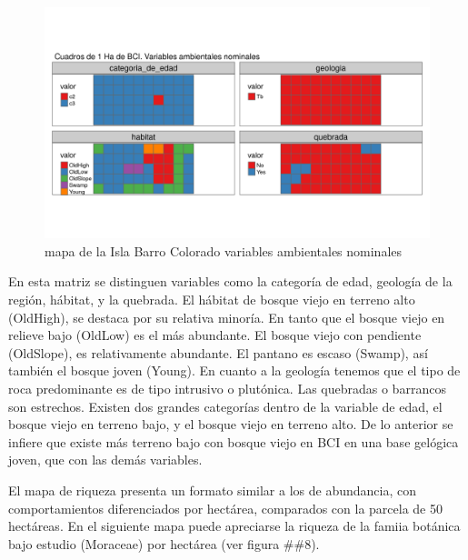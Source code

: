 \documentclass[11pt,]{article}
\begin{document}
\begin{figure}
\centering
\includegraphics[width=1.00000\textwidth]{mapas_variables_ambientales_nominales_tmap.png}
\caption{mapa de la Isla Barro Colorado variables ambientales nominales
\label{fig:bci_map}}
\end{figure}

En esta matriz se distinguen variables como la categoría de edad,
geología de la región, hábitat, y la quebrada. El hábitat de bosque
viejo en terreno alto (OldHigh), se destaca por su relativa minoría. En
tanto que el bosque viejo en relieve bajo (OldLow) es el más abundante.
El bosque viejo con pendiente (OldSlope), es relativamente abundante. El
pantano es escaso (Swamp), así también el bosque joven (Young). En
cuanto a la geología tenemos que el tipo de roca predominante es de tipo
intrusivo o plutónica. Las quebradas o barrancos son estrechos. Existen
dos grandes categorías dentro de la variable de edad, el bosque viejo en
terreno bajo, y el bosque viejo en terreno alto. De lo anterior se
infiere que existe más terreno bajo con bosque viejo en BCI en una base
gelógica joven, que con las demás variables.

El mapa de riqueza presenta un formato similar a los de abundancia, con
comportamientos diferenciados por hectárea, comparados con la parcela de
50 hectáreas. En el siguiente mapa puede apreciarse la riqueza de la
famiia botánica bajo estudio (Moraceae) por hectárea (ver figura \#\#8).
\end{document}

